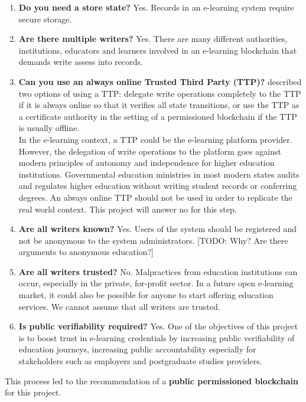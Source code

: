 \begin{enumerate}
	\item \textbf{Do you need a store state?} Yes. Records in an e-learning system require secure storage.
	\item \textbf{Are there multiple writers?} Yes. There are many different authorities, institutions, educators and learners
	      involved in an e-learning blockchain that demands write assess into records.
	\item \textbf{Can you use an always online Trusted Third Party (TTP)?} \citet[p.2]{wust2017you} described two options of
	      using a TTP: delegate write operations completely to the TTP if it is always online so that it verifies all state
	      transitions, or use the TTP as a certificate authority in the setting of a permissioned blockchain if the TTP is usually
	      offline.\\
	      In the e-learning context, a TTP could be the e-learning platform provider. However, the delegation of write operations
	      to the platform goes against modern principles of autonomy and independence for higher education institutions.
	      Governmental education ministries in most modern states audits and regulates higher education without writing student
	      records or conferring degrees. An always online TTP should not be used in order to replicate the real world context. This
	      project will answer no for this step.
	\item \textbf{Are all writers known?} Yes. Users of the system should be registered and not be anonymous to the system
	      administrators. [TODO: Why? Are there arguments to anonymous education?]
	\item \textbf{Are all writers trusted?} No. Malpractices from education institutions can occur, especially in the private,
	      for-profit sector. In a future open e-learning market, it could also be possible for anyone to start offering education
	      services. We cannot assume that all writers are trusted.
	\item \textbf{Is public verifiability required?} Yes. One of the objectives of this project is to boost trust in e-learning
	      credentials by increasing public verifiability of education journeys, increasing public accountability especially for
	      stakeholders such as employers and postgraduate studies providers.
\end{enumerate}

This process led to the recommendation of a \textbf{public permissioned blockchain} for this project.

